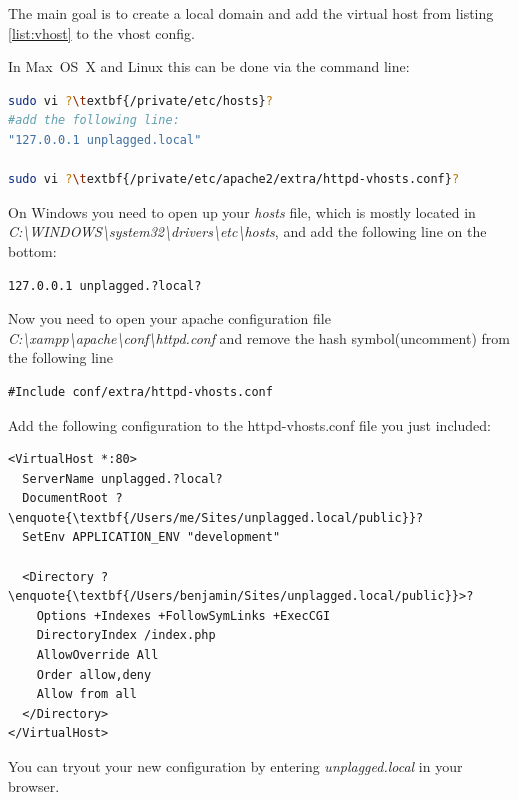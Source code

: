 The main goal is to create a local domain and add the virtual host from listing \ref{list:vhost} to the vhost config. 

In Max~OS~X and Linux this can be done via 
the command line: 

\begin{lstlisting}[caption=Mac OS X: Creating virtual host, language=bash]
sudo vi ?\textbf{/private/etc/hosts}?
#add the following line:
"127.0.0.1 unplagged.local"

sudo vi ?\textbf{/private/etc/apache2/extra/httpd-vhosts.conf}?
\end{lstlisting}

On Windows you need to open up your \textit{hosts} file, which is mostly located in \\
\textit{C:\textbackslash WINDOWS\textbackslash system32\textbackslash drivers\textbackslash etc\textbackslash hosts}, 
and add the following line on the bottom:

\begin{lstlisting}[caption=New host declaration]
127.0.0.1 unplagged.?local?
\end{lstlisting}

Now you need to open your apache configuration file 
\textit{C:\textbackslash xampp\textbackslash apache\textbackslash conf\textbackslash httpd.conf} and 
remove the hash symbol(uncomment) from the following line

\begin{lstlisting}[caption=httpd.conf]
#Include conf/extra/httpd-vhosts.conf
\end{lstlisting}

Add the following configuration to the httpd-vhosts.conf file you just included:

\begin{lstlisting}[caption=Apache configuration, label=list:vhost]
<VirtualHost *:80>
  ServerName unplagged.?local?
  DocumentRoot ?\enquote{\textbf{/Users/me/Sites/unplagged.local/public}}? 
  SetEnv APPLICATION_ENV "development" 
  
  <Directory ?\enquote{\textbf{/Users/benjamin/Sites/unplagged.local/public}}>?
    Options +Indexes +FollowSymLinks +ExecCGI
    DirectoryIndex /index.php
    AllowOverride All
    Order allow,deny
    Allow from all
  </Directory>
</VirtualHost>
\end{lstlisting}

You can tryout your new configuration by entering \textit{unplagged.local} in your browser.

